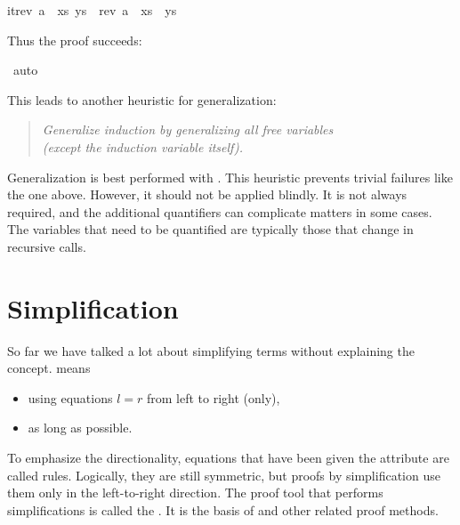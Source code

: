 \begin{isabellebody}
\begin{isamarkuptxt}
\begin{isabelle}
itrev\ {}a\ {}\ xs{}\ ys\ {}\ rev\ {}a\ {}\ xs{}\ {}\ ys%
\end{isabelle}
Thus the proof succeeds:%
\end{isamarkuptxt}%
\isamarkuptrue%
\isamarkupfalse%
\ auto\isanewline
{}\isamarkupfalse%
%
\endisatagproof
{\isafoldproof}%
%
\isadelimproof
%
\endisadelimproof
%
\begin{isamarkuptext}%
This leads to another heuristic for generalization:
\begin{quote}
\emph{Generalize induction by generalizing all free
variables\\ {\em(except the induction variable itself)}.}
\end{quote}
Generalization is best performed with . 
This heuristic prevents trivial failures like the one above.
However, it should not be applied blindly.
It is not always required, and the additional quantifiers can complicate
matters in some cases. The variables that need to be quantified are typically
those that change in recursive calls.

\section{Simplification}

So far we have talked a lot about simplifying terms without explaining the concept.  means
\begin{itemize}
\item using equations $l = r$ from left to right (only),
\item as long as possible.
\end{itemize}
To emphasize the directionality, equations that have been given the
 attribute are called 
rules. Logically, they are still symmetric, but proofs by
simplification use them only in the left-to-right direction.  The proof tool
that performs simplifications is called the . It is the
basis of  and other related proof methods.


\end{isamarkuptext}
\end{isabellebody}
